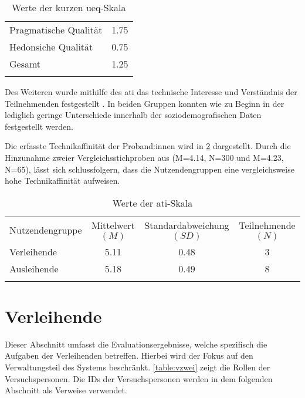 \begin{table}[h]
  \centering
  \caption{Werte der kurzen \ac{ueq}-Skala}
  \begin{tabular}{lc}
    \arrayrulecolor{maincolor}\hline
    Pragmatische Qualität & 1.75 \\
    Hedonsiche Qualität   & 0.75 \\
    Gesamt                & 1.25 \\
    \arrayrulecolor{maincolor}\hline
  \end{tabular}
  \label{table:ueq}
\end{table}

Des Weiteren wurde mithilfe des \ac{ati} das technische Interesse und Verständnis der Teilnehmenden
festgestellt \cite{attig_assessing_2017}. In beiden Gruppen konnten wie zu Beginn in der
 lediglich geringe Unterschiede innerhalb der soziodemografischen Daten
festgestellt werden.

Die erfasste Technikaffinität der Proband:innen wird in \ref{table:atipartzwei} dargestellt. Durch
die Hinzunahme zweier Vergleichsstichproben aus  (M=4.14, N=300 und
M=4.23, N=65), lässt sich schlussfolgern, dass die Nutzendengruppen eine vergleichsweise hohe
Technikaffinität aufweisen.

\begin{table}[h]
  \centering
  \caption{Werte der \ac{ati}-Skala}
  \begin{tabular}{lccc}
    \arrayrulecolor{maincolor}\hline
    \sffamily\color{maincolor}Nutzendengruppe            &
    \sffamily\color{maincolor}Mittelwert $(M)$          &
    \sffamily\color{maincolor}Standardabweichung $(SD)$ &
    \sffamily\color{maincolor}Teilnehmende $(N)$                        \\
    \arrayrulecolor{maincolor}\hline
    Verleihende                                         & 5.11 & 0.48 & 3 \\
    Ausleihende                                         & 5.18 & 0.49 & 8 \\
    \arrayrulecolor{maincolor}\hline
  \end{tabular}
  \label{table:atipartzwei}
\end{table}

\section{Verleihende}
\label{sec:ev-ver}
Dieser Abschnitt umfasst die Evaluationsergebnisse, welche spezifisch die Aufgaben der Verleihenden
betreffen. Hierbei wird der Fokus auf den Verwaltungsteil des Systems beschränkt. \ref{table:vzwei}
zeigt die Rollen der Versuchspersonen. Die IDs der Versuchspersonen werden in dem folgenden
Abschnitt als Verweise verwendet.

